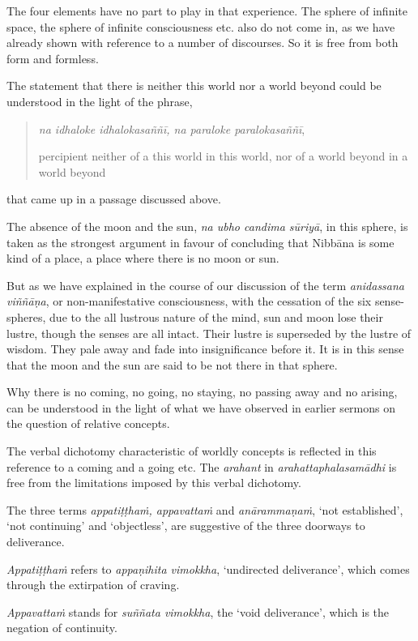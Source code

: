 The four elements have no part to play in that experience. The sphere of infinite space, the sphere of infinite consciousness etc. also do not come in, as we have already shown with reference to a number of discourses. So it is free from both form and formless.

The statement that there is neither this world nor a world beyond could be understood in the light of the phrase,

\begin{quote}
\emph{na idhaloke idhalokasaññī, na paraloke paralokasaññī},

percipient neither of a this world in this world, nor of a world beyond in a world beyond
\end{quote}

that came up in a passage discussed above.

The absence of the moon and the sun, \emph{na ubho candima sūriyā}, in this sphere, is taken as the strongest argument in favour of concluding that Nibbāna is some kind of a place, a place where there is no moon or sun.

But as we have explained in the course of our discussion of the term \emph{anidassana viññāṇa}, or non-manifestative consciousness, with the cessation of the six sense-spheres, due to the all lustrous nature of the mind, sun and moon lose their lustre, though the senses are all intact. Their lustre is superseded by the lustre of wisdom. They pale away and fade into insignificance before it. It is in this sense that the moon and the sun are said to be not there in that sphere.

Why there is no coming, no going, no staying, no passing away and no arising, can be understood in the light of what we have observed in earlier sermons on the question of relative concepts.

The verbal dichotomy characteristic of worldly concepts is reflected in this reference to a coming and a going etc. The \emph{arahant} in \emph{arahattaphalasamādhi} is free from the limitations imposed by this verbal dichotomy.

The three terms \emph{appatiṭṭhaṁ, appavattaṁ} and \emph{anārammaṇaṁ}, `not established', `not continuing' and `objectless', are suggestive of the three doorways to deliverance.

\emph{Appatiṭṭhaṁ} refers to \emph{appaṇihita vimokkha}, `undirected deliverance', which comes through the extirpation of craving.

\emph{Appavattaṁ} stands for \emph{suññata vimokkha}, the `void deliverance', which is the negation of continuity.

